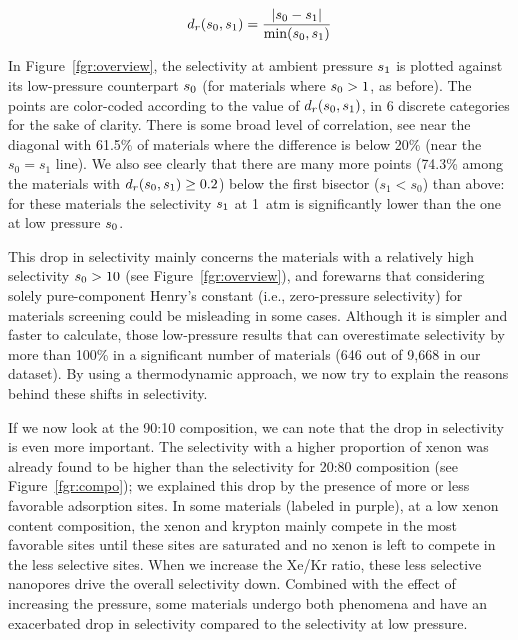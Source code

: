 \documentclass[main.tex]{subfiles}
\begin{document}
\begin{equation}\label{eq:reldiff}
    d_r(s_{\text{0}},s_{\text{1}}) = \dfrac{\lvert s_{\text{0}} - s_{\text{1}} \rvert}{\min(s_{\text{0}},s_{\text{1}})}
\end{equation}

In Figure~\ref{fgr:overview}, the selectivity at ambient pressure $s_{\text{1}}$ is plotted against its low-pressure counterpart $s_{\text{0}}$ (for materials where $s_{\text{0}} > 1$, as before). The points are color-coded according to the value of $d_r(s_{\text{0}},s_{\text{1}})$, in 6 discrete categories for the sake of clarity. There is some broad level of correlation, see near the diagonal with {61.5\%} of materials where the difference is below {20\%} (near the $s_0 = s_1$ line). We also see clearly that there are many more points ({74.3\%} among the materials with $d_r(s_{\text{0}},s_{\text{1}})\ge 0.2$) below the first bisector ($s_1 < s_0$) than above: for these materials the selectivity $s_{\text{1}}$ at 1~atm is significantly lower than the one at low pressure $s_{\text{0}}$.

This drop in selectivity mainly concerns the materials with a relatively high selectivity $s_{\text{0}} > 10$ (see Figure~\ref{fgr:overview}), and forewarns that considering solely pure-component Henry's constant (i.e., zero-pressure selectivity) for materials screening could be misleading in some cases. Although it is simpler and faster to calculate, those low-pressure results that can overestimate selectivity by more than {100\%} in a significant number of materials (646 out of 9,668 in our dataset). 
By using a thermodynamic approach, we now try to explain the reasons behind these shifts in selectivity.

If we now look at the 90:10 composition, we can note that the drop in selectivity is even more important. The selectivity with a higher proportion of xenon was already found to be higher than the selectivity for 20:80 composition (see Figure~\ref{fgr:compo}); we explained this drop by the presence of more or less favorable adsorption sites. In some materials (labeled in purple), at a low xenon content composition, the xenon and krypton mainly compete in the most favorable sites until these sites are saturated and no xenon is left to compete in the less selective sites. When we increase the Xe/Kr ratio, these less selective nanopores drive the overall selectivity down. Combined with the effect of increasing the pressure, some materials undergo both phenomena and have an exacerbated drop in selectivity compared to the selectivity at low pressure. 
\end{document}

